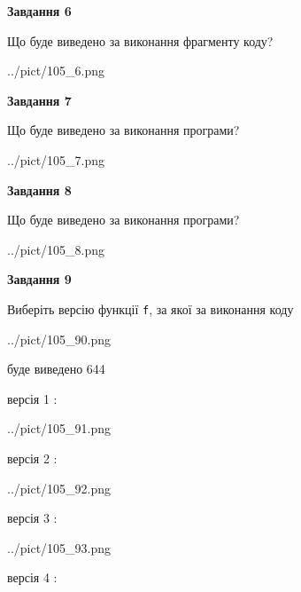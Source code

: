 \documentclass[12pt, ukrainian]{article}
\def\code#1{\Verb!#1!}
\begin{document}
{\begin {large}
{\begin {center}\textbf{Завдання 6}\end {center}}

Що буде виведено за виконання фрагменту коду?\par
\begin{center}
	{../pict/105_6.png}
\end{center}
\newpage

{\begin {center}\textbf{Завдання 7}\end {center}}

Що буде виведено за виконання програми?\par
\begin{center}
	{../pict/105_7.png}
\end{center}
\newpage

{\begin {center}\textbf{Завдання 8}\end {center}}

Що буде виведено за виконання програми?\par
\begin{center}
	{../pict/105_8.png}
\end{center}
\newpage

{\begin {center}\textbf{Завдання 9}\end {center}}

Виберіть версію функції \code{f}, за якої за виконання коду
\begin{center}
	{../pict/105_90.png}
\end{center}
буде виведено 644

\vspace{5mm}
версія 1 :

\begin{center}
	{../pict/105_91.png}
\end{center}
версія 2 :

\begin{center}
	{../pict/105_92.png}
\end{center}
версія 3 :

\begin{center}
	{../pict/105_93.png}
\end{center}
версія 4 :


\end{large}}
\end{document}
